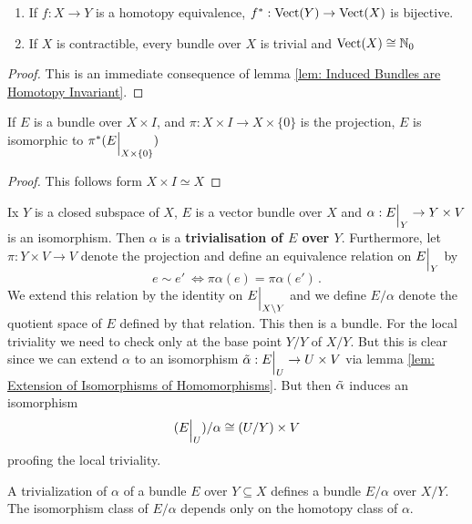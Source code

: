 \begin{lemma}\label{lem: contractible bundles are tivial}
	\begin{enumerate}
		\item If $f:X\to Y$ is a homotopy equivalence, $f^*:\operatorname{\mathrm{Vect}}(Y)\to \operatorname{\mathrm{Vect}}(X)$ is bijective.
		\item If $X$ is contractible, every bundle over $X$ is trivial and $\operatorname{\mathrm{Vect}}(X)\cong \mathbb{N}_0$
	\end{enumerate}
\end{lemma}
\begin{proof}
	This is an immediate consequence of lemma \ref{lem: Induced Bundles are Homotopy Invariant}.
\end{proof}
\begin{lemma}
	If $E$ is a bundle over $X\times I$, and $\pi:X\times I \to X\times \{0\}$ is the projection, $E$ is isomorphic to $\pi^*({E}\einsch{X\times \{0\}})$
\end{lemma}
\begin{proof}
	This follows form $X\times I \simeq X$
\end{proof}
\begin{definition}\label{def: Trivialisation of a Vector Bundle}
	Ix $Y$ is a closed subspace of $X$, $E$ is a vector bundle over $X$ and $\alpha:{E}\einsch{Y}\to Y\times V$ is an isomorphism. Then $\alpha$ is a \textbf{trivialisation of $E$ over $Y$}. Furthermore, let $\pi: Y \times V \to V$ denote the projection and define an equivalence relation on ${E}\einsch{Y}$ by 
	\begin{equation*}
		e\sim e' ~ \Leftrightarrow \pi \alpha (e) =\pi \alpha (e') \, .
	\end{equation*}  We extend this relation by the identity on ${E}\einsch{X\setminus Y}$ and we define $E\slash \alpha$ denote the quotient space of $E$ defined by that relation. This then is a bundle. For the local triviality we need to check only at the base point $Y\slash Y$ of $X\slash Y$. But this is clear since we can extend $\alpha$ to an isomorphism $\Tilde{\alpha}:{E}\einsch{U}\to U \times V$ via lemma \ref{lem: Extension of Isomorphisms of Homomorphisms}. But then $\Tilde{\alpha}$ induces an isomorphism
	\begin{equation*}
		({E}\einsch{U})\slash \alpha \cong  (U\slash Y) \times V
	\end{equation*}
	proofing the local triviality.
\end{definition} 
\begin{lemma}
	A trivialization of $\alpha$ of a bundle $E$ over $Y\subseteq X$ defines a bundle $E\slash \alpha$ over $X\slash Y$. The isomorphism class of $E\slash \alpha$ depends only on the homotopy class of $\alpha$. 
\end{lemma}
